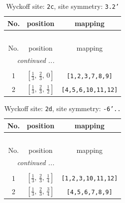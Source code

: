 \documentclass[fleqn,8pt]{jsarticle}
\begin{document}
\renewcommand{\arraystretch}{1.2}
\begin{longtable}{ccc}
\caption{Wyckoff site: {\tt 2c}, site symmetry: {\tt 3.2'}}
 \\
 \hline \hline
No. & position & mapping \\ \hline \endfirsthead

\multicolumn{2}{l}{\tablename\ \thetable{}} \\
 \hline \hline
No. & position & mapping \\ \hline \endhead

 \hline \hline
\multicolumn{2}{r}{\footnotesize\it continued ...} \\ \endfoot

 \hline \hline
\multicolumn{2}{r}{} \\ \endlastfoot

1 & $\left[ \frac{1}{3},\, \frac{2}{3},\, 0 \right]$ & {\tt [1,2,3,7,8,9]} \\ \hline
2 & $\left[ \frac{1}{3},\, \frac{2}{3},\, \frac{1}{2} \right]$ & {\tt [4,5,6,10,11,12]} \\
\end{longtable}
\renewcommand{\arraystretch}{1.2}
\begin{longtable}{ccc}
\caption{Wyckoff site: {\tt 2d}, site symmetry: {\tt -6'..}}
 \\
 \hline \hline
No. & position & mapping \\ \hline \endfirsthead

\multicolumn{2}{l}{\tablename\ \thetable{}} \\
 \hline \hline
No. & position & mapping \\ \hline \endhead

 \hline \hline
\multicolumn{2}{r}{\footnotesize\it continued ...} \\ \endfoot

 \hline \hline
\multicolumn{2}{r}{} \\ \endlastfoot

1 & $\left[ \frac{1}{3},\, \frac{2}{3},\, \frac{1}{4} \right]$ & {\tt [1,2,3,10,11,12]} \\ \hline
2 & $\left[ \frac{1}{3},\, \frac{2}{3},\, \frac{3}{4} \right]$ & {\tt [4,5,6,7,8,9]} \\
\end{longtable}
\renewcommand{\arraystretch}{1.2}
\end{document}
